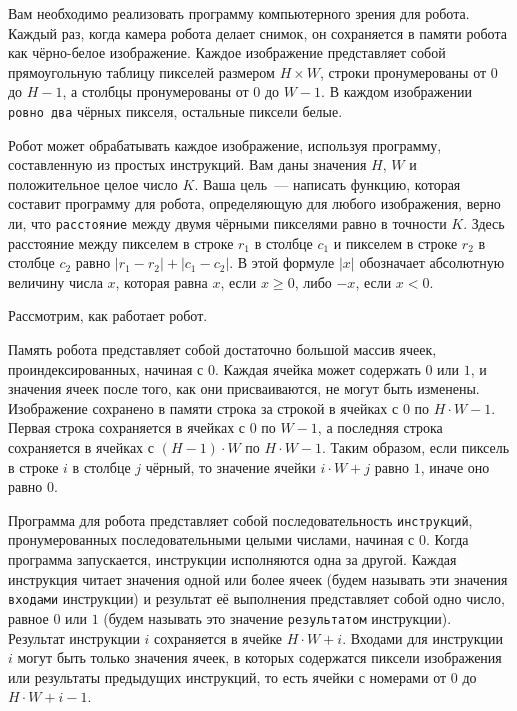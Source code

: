 Вам необходимо реализовать программу компьютерного зрения для робота.
Каждый раз, когда камера робота делает снимок, он сохраняется в памяти робота
как чёрно-белое изображение. Каждое изображение представляет собой
прямоугольную таблицу пикселей размером $H \times W$, строки пронумерованы от $0$
до $H-1$, а столбцы пронумерованы от $0$ до $W-1$. В каждом изображении \texttt{ровно
два} чёрных пикселя, остальные пиксели белые.

Робот может обрабатывать каждое изображение, используя программу,
составленную из простых инструкций. Вам даны значения $H$, $W$ и положительное
целое число $K$. Ваша цель~--- написать функцию, которая составит программу для
робота, определяющую для любого изображения, верно ли, что \texttt{расстояние}
между двумя чёрными пикселями равно в точности $K$. Здесь расстояние между
пикселем в строке $r_1$ в столбце $c_1$ и пикселем в строке $r_2$ в столбце $c_2$ равно $|r_1-r_2|+|c_1-c_2|$. В этой формуле $|x|$ обозначает абсолютную величину числа $x$,
которая равна $x$, если $x \geq 0$, либо $-x$, если $x < 0$.

Рассмотрим, как работает робот.

Память робота представляет собой достаточно большой массив ячеек,
проиндексированных, начиная с $0$. Каждая ячейка может содержать $0$ или $1$, и
значения ячеек после того, как они присваиваются, не могут быть изменены.
Изображение сохранено в памяти строка за строкой в ячейках с $0$ по $H \cdot W - 1$.
Первая строка сохраняется в ячейках с $0$ по $W-1$, а последняя строка
сохраняется в ячейках с $(H - 1) \cdot W$ по $H \cdot W - 1$. Таким образом, если пиксель в строке $i$ в столбце $j$ чёрный, то значение ячейки $i \cdot W + j$ равно $1$, иначе оно
равно $0$.

Программа для робота представляет собой последовательность \texttt{инструкций},
пронумерованных последовательными целыми числами, начиная с $0$. Когда
программа запускается, инструкции исполняются одна за другой. Каждая
инструкция читает значения одной или более ячеек (будем называть эти значения
\texttt{входами} инструкции) и результат её выполнения представляет собой одно число,
равное $0$ или $1$ (будем называть это значение \texttt{результатом} инструкции).
Результат инструкции $i$ сохраняется в ячейке $H \cdot W + i$. Входами для инструкции $i$
могут быть только значения ячеек, в которых содержатся пиксели изображения
или результаты предыдущих инструкций, то есть ячейки с номерами от $0$ до $H \cdot W + i - 1$.


